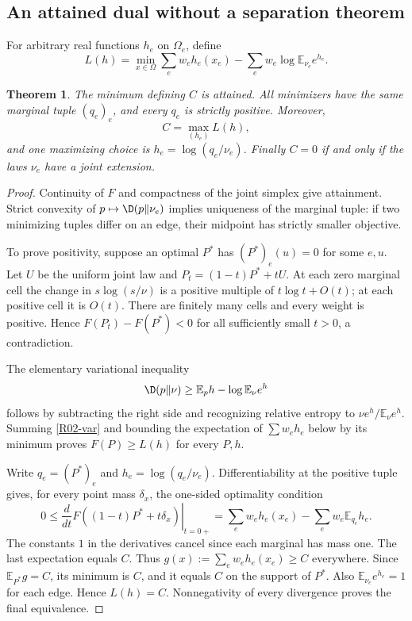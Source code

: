 \documentclass[11pt,a4paper]{article}
\newtheorem{theorem}{Theorem}[section]
\theoremstyle{definition}\newtheorem{definition}[theorem]{Definition}
\theoremstyle{remark}\newtheorem{remark}[theorem]{Remark}
\newcommand{\E}{\mathbb E}\newcommand{\one}{\mathbf 1}\newcommand{\1}{\mathbf 1}
\numberwithin{equation}{section}
\begin{document}
\subsection{An attained dual without a separation theorem}\label{R02-sec-2}
For arbitrary real functions $h_e$ on $\Omega_e$, define
\begin{equation}\label{R02-dual}
L(h)=\min_{x\in\Omega}\sum_e w_eh_e(x_e)
      -\sum_e w_e\log\E_{\nu_e}e^{h_e}.
\end{equation}
\begin{theorem}\label{R02-duality}
The minimum defining $C$ is attained. All minimizers have the same marginal tuple $(q_e)_e$, and every $q_e$ is strictly positive. Moreover,
\begin{equation}\label{R02-strong}
C=\max_{(h_e)}L(h),
\end{equation}
and one maximizing choice is $h_e=\log(q_e/\nu_e)$. Finally $C=0$ if and only if the laws $\nu_e$ have a joint extension.
\end{theorem}
\begin{proof}
Continuity of $F$ and compactness of the joint simplex give attainment. Strict convexity of $p\mapsto\D(p\Vert\nu_e)$ implies uniqueness of the marginal tuple: if two minimizing tuples differ on an edge, their midpoint has strictly smaller objective.

To prove positivity, suppose an optimal $P^*$ has $(P^*)_e(u)=0$ for some $e,u$. Let $U$ be the uniform joint law and $P_t=(1-t)P^*+tU$. At each zero marginal cell the change in $s\log(s/\nu)$ is a positive multiple of $t\log t+O(t)$; at each positive cell it is $O(t)$. There are finitely many cells and every weight is positive. Hence $F(P_t)-F(P^*)<0$ for all sufficiently small $t>0$, a contradiction.

The elementary variational inequality
\begin{equation}\label{R02-var}
\D(p\Vert\nu)\geq\E_p h-\log\E_\nu e^h
\end{equation}
follows by subtracting the right side and recognizing relative entropy to $\nu e^h/\E_\nu e^h$. Summing \eqref{R02-var} and bounding the expectation of $\sum w_eh_e$ below by its minimum proves $F(P)\geq L(h)$ for every $P,h$.

Write $q_e=(P^*)_e$ and $h_e=\log(q_e/\nu_e)$. Differentiability at the positive tuple gives, for every point mass $\delta_x$, the one-sided optimality condition
\[
0\leq\left.\frac{d}{dt}F((1-t)P^*+t\delta_x)\right|_{t=0+}
 =\sum_e w_eh_e(x_e)-\sum_e w_e\E_{q_e}h_e.
\]
The constants $1$ in the derivatives cancel since each marginal has mass one. The last expectation equals $C$. Thus $g(x):=\sum_e w_eh_e(x_e)\geq C$ everywhere. Since $\E_{P^*}g=C$, its minimum is $C$, and it equals $C$ on the support of $P^*$. Also $\E_{\nu_e}e^{h_e}=1$ for each edge. Hence $L(h)=C$. Nonnegativity of every divergence proves the final equivalence.
\end{proof}
\end{document}

